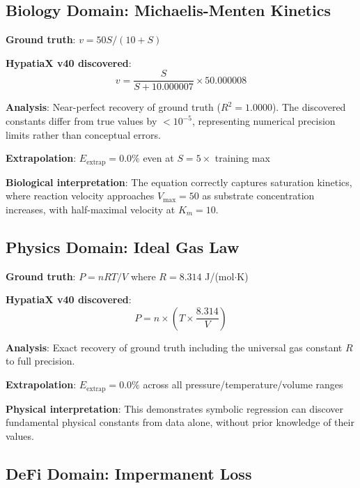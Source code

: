 \documentclass[twoside,11pt]{article}
\begin{document}
\subsection{Biology Domain: Michaelis-Menten Kinetics}

\begin{example}
\textbf{Ground truth}: $v = 50S/(10 + S)$

\textbf{HypatiaX v40 discovered}:
\begin{equation}
v = \frac{S}{S + 10.000007} \times 50.000008
\end{equation}

\textbf{Analysis}: Near-perfect recovery of ground truth ($R^2 = 1.0000$). The discovered constants differ from true values by $<10^{-5}$, representing numerical precision limits rather than conceptual errors.

\textbf{Extrapolation}: $E_{\text{extrap}} = 0.0\%$ even at $S = 5\times$ training max

\textbf{Biological interpretation}: The equation correctly captures saturation kinetics, where reaction velocity approaches $V_{\max} = 50$ as substrate concentration increases, with half-maximal velocity at $K_m = 10$.
\end{example}

\subsection{Physics Domain: Ideal Gas Law}

\begin{example}
\textbf{Ground truth}: $P = nRT/V$ where $R = 8.314$ J/(mol$\cdot$K)

\textbf{HypatiaX v40 discovered}:
\begin{equation}
P = n \times \left(T \times \frac{8.314}{V}\right)
\end{equation}

\textbf{Analysis}: Exact recovery of ground truth including the universal gas constant $R$ to full precision.

\textbf{Extrapolation}: $E_{\text{extrap}} = 0.0\%$ across all pressure/temperature/volume ranges

\textbf{Physical interpretation}: This demonstrates symbolic regression can discover fundamental physical constants from data alone, without prior knowledge of their values.
\end{example}

\subsection{DeFi Domain: Impermanent Loss}
\end{document}

